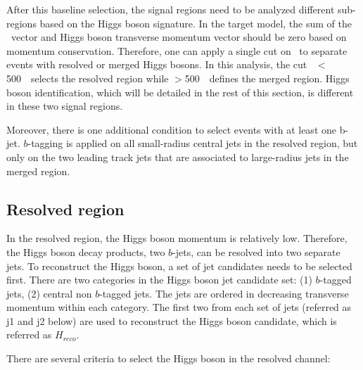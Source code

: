 \par After this baseline selection, the signal regions need to be analyzed different sub-regions based on the Higgs boson signature. 
In the target model, the sum of the \met~vector and Higgs boson transverse momentum vector should be zero based on momentum conservation. 
Therefore, one can apply a single cut on \met~to separate events with resolved or merged Higgs bosons. In this analysis, the cut \met~$<$500~\GeV~selects the resolved region while \met$>$500~\GeV~defines the merged region. Higgs boson identification, which will be detailed in the rest of this section, is different in these two signal regions.
\par Moreover, there is one additional condition to select events with at least one b-jet. $b$-tagging is applied on all small-radius central jets in the resolved region, but only on the two leading track jets that are associated to large-radius jets in the merged region.

\subsection{Resolved region}

\par In the resolved region, the Higgs boson momentum is relatively low. Therefore, the Higgs boson decay products, two $b$-jets, can be resolved into two separate jets. To reconstruct the Higgs boson, a set of jet candidates needs to be selected first. There are two categories in the Higgs boson jet candidate set: (1) $b$-tagged jets, (2) central non $b$-tagged jets. The jets are ordered in decreasing transverse momentum within each category. The first two from each set of jets (referred as j1 and j2 below) are used to reconstruct the Higgs boson candidate, which is referred as $H_{reco}$.

\par There are several criteria to select the Higgs boson in the resolved channel:

